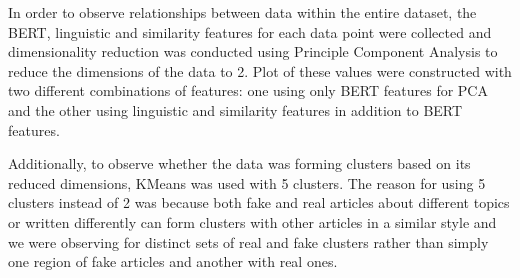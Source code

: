 \documentclass{article}
\begin{document}

In order to observe relationships between data within the entire dataset, the BERT, linguistic and similarity features for each data point were collected and dimensionality reduction was conducted using Principle Component Analysis to reduce the dimensions of the data to 2. Plot of these values were constructed with two different combinations of features: one using only BERT features for PCA and the other using linguistic and similarity features in addition to BERT features.

Additionally, to observe whether the data was forming clusters based on its reduced dimensions, KMeans was used with 5 clusters. The reason for using 5 clusters instead of 2 was because both fake and real articles about different topics or written differently can form clusters with other articles in a similar style and we were observing for distinct sets of real and fake clusters rather than simply one region of fake articles and another with real ones.
\end{document}
